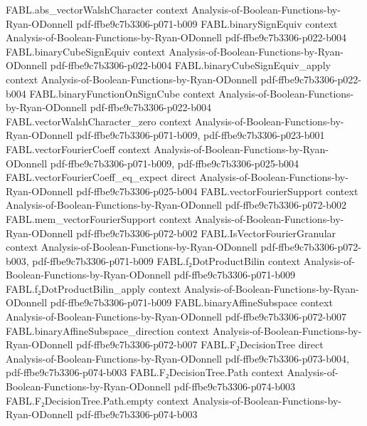 \begin{theorem}
\proofstep
  {FABL.abs_vectorWalshCharacter}
  {context}
  {Analysis-of-Boolean-Functions-by-Ryan-ODonnell}
  {pdf-ffbe9c7b3306-p071-b009}
\proofstep
  {FABL.binarySignEquiv}
  {context}
  {Analysis-of-Boolean-Functions-by-Ryan-ODonnell}
  {pdf-ffbe9c7b3306-p022-b004}
\proofstep
  {FABL.binaryCubeSignEquiv}
  {context}
  {Analysis-of-Boolean-Functions-by-Ryan-ODonnell}
  {pdf-ffbe9c7b3306-p022-b004}
\proofstep
  {FABL.binaryCubeSignEquiv_apply}
  {context}
  {Analysis-of-Boolean-Functions-by-Ryan-ODonnell}
  {pdf-ffbe9c7b3306-p022-b004}
\proofstep
  {FABL.binaryFunctionOnSignCube}
  {context}
  {Analysis-of-Boolean-Functions-by-Ryan-ODonnell}
  {pdf-ffbe9c7b3306-p022-b004}
\proofstep
  {FABL.vectorWalshCharacter_zero}
  {context}
  {Analysis-of-Boolean-Functions-by-Ryan-ODonnell}
  {pdf-ffbe9c7b3306-p071-b009,
    pdf-ffbe9c7b3306-p023-b001}
\proofstep
  {FABL.vectorFourierCoeff}
  {context}
  {Analysis-of-Boolean-Functions-by-Ryan-ODonnell}
  {pdf-ffbe9c7b3306-p071-b009,
    pdf-ffbe9c7b3306-p025-b004}
\proofstep
  {FABL.vectorFourierCoeff_eq_expect}
  {direct}
  {Analysis-of-Boolean-Functions-by-Ryan-ODonnell}
  {pdf-ffbe9c7b3306-p025-b004}
\proofstep
  {FABL.vectorFourierSupport}
  {context}
  {Analysis-of-Boolean-Functions-by-Ryan-ODonnell}
  {pdf-ffbe9c7b3306-p072-b002}
\proofstep
  {FABL.mem_vectorFourierSupport}
  {context}
  {Analysis-of-Boolean-Functions-by-Ryan-ODonnell}
  {pdf-ffbe9c7b3306-p072-b002}
\proofstep
  {FABL.IsVectorFourierGranular}
  {context}
  {Analysis-of-Boolean-Functions-by-Ryan-ODonnell}
  {pdf-ffbe9c7b3306-p072-b003,
    pdf-ffbe9c7b3306-p071-b009}
\proofstep
  {FABL.f₂DotProductBilin}
  {context}
  {Analysis-of-Boolean-Functions-by-Ryan-ODonnell}
  {pdf-ffbe9c7b3306-p071-b009}
\proofstep
  {FABL.f₂DotProductBilin_apply}
  {context}
  {Analysis-of-Boolean-Functions-by-Ryan-ODonnell}
  {pdf-ffbe9c7b3306-p071-b009}
\proofstep
  {FABL.binaryAffineSubspace}
  {context}
  {Analysis-of-Boolean-Functions-by-Ryan-ODonnell}
  {pdf-ffbe9c7b3306-p072-b007}
\proofstep
  {FABL.binaryAffineSubspace_direction}
  {context}
  {Analysis-of-Boolean-Functions-by-Ryan-ODonnell}
  {pdf-ffbe9c7b3306-p072-b007}
\proofstep
  {FABL.F₂DecisionTree}
  {direct}
  {Analysis-of-Boolean-Functions-by-Ryan-ODonnell}
  {pdf-ffbe9c7b3306-p073-b004,
    pdf-ffbe9c7b3306-p074-b003}
\proofstep
  {FABL.F₂DecisionTree.Path}
  {context}
  {Analysis-of-Boolean-Functions-by-Ryan-ODonnell}
  {pdf-ffbe9c7b3306-p074-b003}
\proofstep
  {FABL.F₂DecisionTree.Path.empty}
  {context}
  {Analysis-of-Boolean-Functions-by-Ryan-ODonnell}
  {pdf-ffbe9c7b3306-p074-b003}
\proofstep

\end{theorem}
